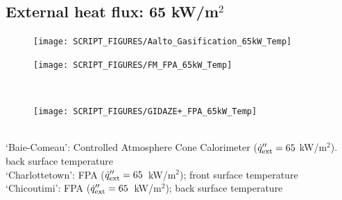 \documentclass{book}
\begin{document}
\begin{landscape}
\subsection{External heat flux: 65 kW/m$^2$}
\begin{minipage}{0.65\textwidth}
\begin{figure}[H]
{\texttt{[image: SCRIPT\_FIGURES/Aalto\_Gasification\_65kW\_Temp]}}\\
\end{figure}
\end{minipage}
\begin{minipage}{0.35\textwidth}
\begin{figure}[H]
{\texttt{[image: SCRIPT\_FIGURES/FM\_FPA\_65kW\_Temp]}}\\
\end{figure}
\end{minipage}\\
\begin{minipage}{0.65\textwidth}
\begin{figure}[H]
{\texttt{[image: SCRIPT\_FIGURES/GIDAZE+\_FPA\_65kW\_Temp]}}\\
\end{figure}
\end{minipage}\\
‘Baie-Comeau’:  Controlled Atmosphere Cone Calorimeter ($\dot{q}_{\rm ext}'' = 65$ kW/m$^2$). back surface temperature \\
‘Charlottetown’:  FPA ($\dot{q}_{\rm ext}'' = 65$~kW/m$^2$); front surface temperature \\
‘Chicoutimi’:   FPA ($\dot{q}_{\rm ext}'' = 65$~kW/m$^2$); back surface temperature  \\

\end{landscape}
\end{document}
